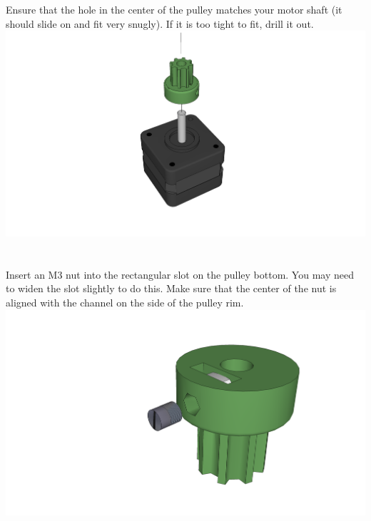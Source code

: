 \documentclass[twoside,a4paper,titlepage]{memoir}
\begin{document}
	\section{}
	Ensure that the hole in the center of the pulley matches your motor shaft (it should slide on and fit very
	snugly). If it is too tight to fit, drill it out.\\
	\includegraphics[width=1\linewidth]{graphics/ch9_1.png}
	
	\section{}
	Insert an M3 nut into the rectangular slot on the pulley bottom. You may need to widen the slot slightly
	to do this. Make sure that the center of the nut is aligned with the channel on the side of the pulley rim.\\
	\includegraphics[width=1\linewidth]{graphics/ch9_2.png}
	
\end{document}
